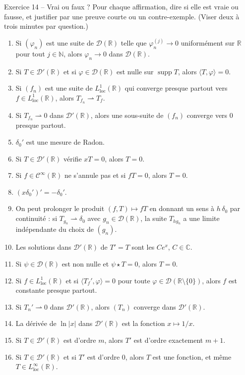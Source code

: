 \documentclass[11pt,a4paper]{article}
\newcommand{\R}{\mathbb{R}}
\newcommand{\N}{\mathbb{N}}
\newcommand{\C}{\mathbb{C}}
\newcommand{\Cinf}{\mathcal{C}^\infty}
\newcommand{\wk}{\rightharpoonup}
\DeclareMathOperator{\supp}{supp}
\newcommand{\D}{\mathcal{D}}
\theoremstyle{definition}
\begin{document}
\begin{exo}{Exercice 14 -- Vrai ou faux ?}
Pour chaque affirmation, dire si elle est vraie ou fausse, et justifier par une preuve courte ou un contre-exemple. (Viser deux à trois minutes par question.)
\begin{enumerate}[label=\arabic*.]
  \item Si $(\varphi_n)$ est une suite de $\D(\R)$ telle que $\varphi_n^{(j)}\to0$ uniformément sur $\R$ pour tout $j\in\N$, alors $\varphi_n\to0$ dans $\D(\R)$.
  \item Si $T\in\D'(\R)$ et si $\varphi\in\D(\R)$ est nulle sur $\supp T$, alors $\langle T,\varphi\rangle=0$.
  \item Si $(f_n)$ est une suite de $L^1_{\mathrm{loc}}(\R)$ qui converge presque partout vers $f\in L^1_{\mathrm{loc}}(\R)$, alors $T_{f_n}\wk T_f$.
  \item Si $T_{f_n}\wk0$ dans $\D'(\R)$, alors une sous-suite de $(f_n)$ converge vers $0$ presque partout.
  \item $\delta_0'$ est une mesure de Radon.
  \item Si $T\in\D'(\R)$ vérifie $xT=0$, alors $T=0$.
  \item Si $f\in\Cinf(\R)$ ne s'annule pas et si $fT=0$, alors $T=0$.
  \item $(x\delta_0')'=-\delta_0'$.
  \item On peut prolonger le produit $(f,T)\mapsto fT$ en donnant un sens à $h\,\delta_0$ par continuité : si $T_{g_n}\wk\delta_0$ avec $g_n\in\D(\R)$, la suite $T_{hg_n}$ a une limite indépendante du choix de $(g_n)$.
  \item Les solutions dans $\D'(\R)$ de $T'=T$ sont les $Ce^x$, $C\in\C$.
  \item Si $\psi\in\D(\R)$ est non nulle et $\psi\star T=0$, alors $T=0$.
  \item Si $f\in L^1_{\mathrm{loc}}(\R)$ et si $\langle T_f',\varphi\rangle=0$ pour toute $\varphi\in\D(\R\setminus\{0\})$, alors $f$ est constante presque partout.
  \item Si $T_n'\wk0$ dans $\D'(\R)$, alors $(T_n)$ converge dans $\D'(\R)$.
  \item La dérivée de $\ln|x|$ dans $\D'(\R)$ est la fonction $x\mapsto1/x$.
  \item Si $T\in\D'(\R)$ est d'ordre $m$, alors $T'$ est d'ordre exactement $m+1$.
  \item Si $T\in\D'(\R)$ et si $T'$ est d'ordre $0$, alors $T$ est une fonction, et même $T\in L^\infty_{\mathrm{loc}}(\R)$.
\end{enumerate}
\end{exo}
\end{document}
